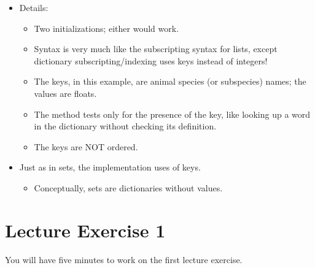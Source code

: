 \documentclass[letterpaper,10pt,english]{sphinxmanual}
\begin{document}
\begin{itemize}
\begin{sphinxVerbatim}[commandchars=\\\{\}]
\end{sphinxVerbatim}

\item {} 
Details:
\begin{itemize}
\item {} 
Two initializations; either would work.

\item {} 
Syntax is very much like the subscripting syntax for lists, except
dictionary subscripting/indexing uses keys instead of integers!

\item {} 
The keys, in this example, are animal species (or subspecies)
names; the values are floats.

\item {} 
The  method tests only for the presence of the key, like
looking up a word in the dictionary without checking its
definition.

\item {} 
The keys are NOT ordered.

\end{itemize}

\item {} 
Just as in sets, the implementation uses  of keys.
\begin{itemize}
\item {} 
Conceptually, sets are dictionaries without values.

\end{itemize}

\end{itemize}


\section{Lecture Exercise 1}
\label{\detokenize{lecture_notes/lec16_dictionaries1:lecture-exercise-1}}
You will have five minutes to work on the first lecture exercise.
\end{document}

